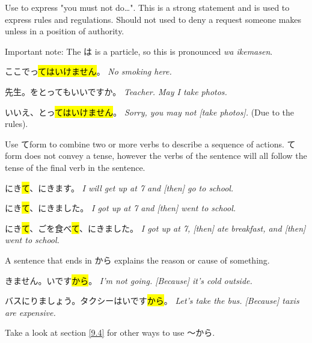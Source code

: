     {
    Use to express "you must not do\dots". This is a strong statement and is used to express rules and regulations. Should not used to deny a request someone makes unless in a position of authority.
    
    \begin{center}
    \end{center}
    
    Important note: The は is a particle, so this is pronounced \textit{wa ikemasen}.
    
    ここでっ\hl{てはいけません}。
    \textit{No smoking here.}
    
    \sectionSplit
     
    先生。をとってもいいですか。
    \textit{Teacher. May I take photos.}
    
    いいえ、とっ\hl{てはいけません}。
    \textit{Sorry, you may not [take photos].} (Due to the rules).
    }

    {
    Use てform to combine two or more verbs to describe a sequence of actions. てform does not convey a tense, however the verbs of the sentence will all follow the tense of the final verb in the sentence.
    
    にき\hl{て}、にきます。
    \textit{I will get up at 7 and [then] go to school.}
    
    にき\hl{て}、にきました。
    \textit{I got up at 7 and [then] went to school.}
    
    にき\hl{て}、ごを食べ\hl{て}、にきました。
    \textit{I got up at 7, [then] ate breakfast, and [then] went to school.}
    }

    {
    A sentence that ends in から explains the reason or cause of something.
    
    \begin{center}
    \end{center}
    
    きません。いです\hl{から}。
    \textit{I'm not going. [Because] it's cold outside.}
    
    バスにりましょう。タクシーはいです\hl{から}。
    \textit{Let's take the bus. [Because] taxis are expensive.}
    
    Take a look at section \ref{9.4} for other ways to use 〜から.
    }

